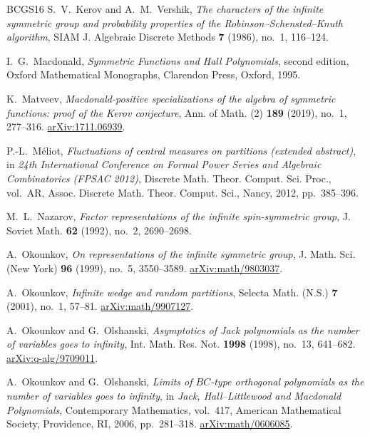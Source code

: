 \documentclass[11pt,reqno]{amsart}
\theoremstyle{definition}
\theoremstyle{remark}
\numberwithin{equation}{section}
\begin{document}
\begin{thebibliography}{BCGS16}
S.~V.~Kerov and A.~M.~Vershik,
\emph{The characters of the infinite symmetric group and probability
properties of the Robinson--Schensted--Knuth algorithm},
SIAM J. Algebraic Discrete Methods \textbf{7} (1986), no.~1, 116--124.

I.~G.~Macdonald,
\emph{Symmetric Functions and Hall Polynomials},
second edition, Oxford Mathematical Monographs,
Clarendon Press, Oxford, 1995.

K.~Matveev,
\emph{Macdonald-positive specializations of the algebra of symmetric
functions: proof of the Kerov conjecture},
Ann. of Math. (2) \textbf{189} (2019), no.~1, 277--316.
\href{https://arxiv.org/abs/1711.06939}{arXiv:1711.06939}.

P.-L.~M\'eliot,
\emph{Fluctuations of central measures on partitions (extended abstract)},
in \emph{24th International Conference on Formal Power Series and Algebraic
Combinatorics (FPSAC 2012)},
Discrete Math. Theor. Comput. Sci. Proc., vol.~AR,
Assoc. Discrete Math. Theor. Comput. Sci., Nancy, 2012, pp.~385--396.

M.~L.~Nazarov,
\emph{Factor representations of the infinite spin-symmetric group},
J. Soviet Math. \textbf{62} (1992), no.~2, 2690--2698.

A.~Okounkov,
\emph{On representations of the infinite symmetric group},
J. Math. Sci. (New York) \textbf{96} (1999), no.~5, 3550--3589.
\href{https://arxiv.org/abs/math/9803037}{arXiv:math/9803037}.

A.~Okounkov,
\emph{Infinite wedge and random partitions},
Selecta Math. (N.S.) \textbf{7} (2001), no.~1, 57--81.
\href{https://arxiv.org/abs/math/9907127}{arXiv:math/9907127}.

A.~Okounkov and G.~Olshanski,
\emph{Asymptotics of Jack polynomials as the number of variables goes to
infinity},
Int. Math. Res. Not. \textbf{1998} (1998), no.~13, 641--682.
\href{https://arxiv.org/abs/q-alg/9709011}{arXiv:q-alg/9709011}.

A.~Okounkov and G.~Olshanski,
\emph{Limits of $BC$-type orthogonal polynomials as the number of variables
goes to infinity},
in \emph{Jack, Hall--Littlewood and Macdonald Polynomials},
Contemporary Mathematics, vol.~417,
American Mathematical Society, Providence, RI, 2006, pp.~281--318.
\href{https://arxiv.org/abs/math/0606085}{arXiv:math/0606085}.


\end{thebibliography}
\end{document}

